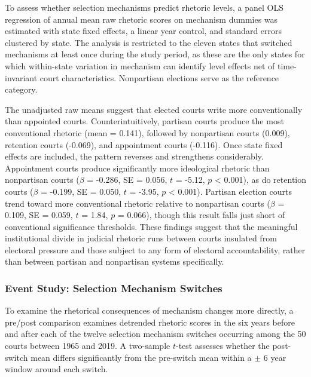 To assess whether selection mechanisms predict rhetoric levels, a panel
OLS regression of annual mean raw rhetoric scores on mechanism dummies
was estimated with state fixed effects, a linear year control, and
standard errors clustered by state. The analysis is restricted to the
eleven states that switched mechanisms at least once during the study
period, as these are the only states for which within-state variation in
mechanism can identify level effects net of time-invariant court
characteristics. Nonpartisan elections serve as the reference category.

The unadjusted raw means suggest that elected courts write more
conventionally than appointed courts. Counterintuitively, partisan
courts produce the most conventional rhetoric (mean = 0.141), followed
by nonpartisan courts (0.009), retention courts (-0.069), and
appointment courts (-0.116). Once state fixed effects are included, the
pattern reverses and strengthens considerably. Appointment courts
produce significantly more ideological rhetoric than nonpartisan courts
(\(\beta\) = -0.286, SE = 0.056, \(t\) = -5.12, \(p\) \textless{}
0.001), as do retention courts (\(\beta\) = -0.199, SE = 0.050, \(t\) =
-3.95, \(p\) \textless{} 0.001). Partisan election courts trend toward
more conventional rhetoric relative to nonpartisan courts (\(\beta\) =
0.109, SE = 0.059, \(t\) = 1.84, \(p\) = 0.066), though this result
falls just short of conventional significance thresholds. These findings
suggest that the meaningful institutional divide in judicial rhetoric
runs between courts insulated from electoral pressure and those subject
to any form of electoral accountability, rather than between partisan
and nonpartisan systems specifically.

\subsubsection{Event Study: Selection Mechanism
Switches}\label{event-study-selection-mechanism-switches}

To examine the rhetorical consequences of mechanism changes more
directly, a pre/post comparison examines detrended rhetoric scores in
the six years before and after each of the twelve selection mechanism
switches occurring among the 50 courts between 1965 and 2019. A
two-sample \(t\)-test assesses whether the post-switch mean differs
significantly from the pre-switch mean within a \(\pm\) 6 year window
around each switch.

